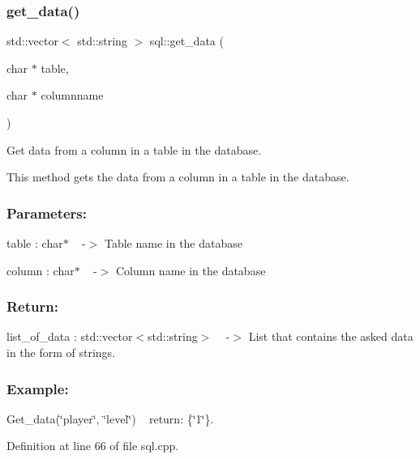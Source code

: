 \subsubsection{\texorpdfstring{get\+\_\+data()}{get\_data()}\hspace{0.1cm}{\footnotesize\ttfamily [1/2]}}
{\footnotesize\ttfamily std\+::vector$<$ std\+::string $>$ sql\+::get\+\_\+data (\begin{DoxyParamCaption}\item[{char $\ast$}]{table,  }\item[{char $\ast$}]{columnname }\end{DoxyParamCaption})}



Get data from a column in a table in the database. 

This method gets the data from a column in a table in the database.~\newline
 \subsubsection*{Parameters\+: }

table \+: char$\ast$ ~\newline
-\/$>$ Table name in the database

column \+: char$\ast$ ~\newline
-\/$>$ Column name in the database

\subsubsection*{Return\+: }

list\+\_\+of\+\_\+data \+: std\+::vector$<$std\+::string$>$ ~\newline
-\/$>$ List that contains the asked data in the form of strings.

\subsubsection*{Example\+: }

Get\+\_\+data(\char`\"{}player\char`\"{}, \char`\"{}level\char`\"{}) ~\newline
return\+: \{\char`\"{}1\char`\"{}\}. 

Definition at line 66 of file sql.\+cpp.

